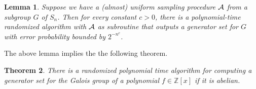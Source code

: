 \documentclass{article}
\newtheorem{theorem}{Theorem}[section]
\newtheorem{lemma}[theorem]{Lemma}
\newcommand{\Z}[0]{\ensuremath{\mathbb{Z}}}
\renewcommand{\angle}[1]{\langle #1\rangle}
\newcommand{\Prob}{\ensuremath{\mathrm{Prob}}}
\begin{document}
\begin{lemma}
  Suppose we have a (almost) uniform sampling procedure ${\cal A}$
  from a subgroup $G$ of $S_n$. Then for every constant $c>0$, there
  is a polynomial-time randomized algorithm with ${\cal A}$ as
  subroutine that outputs a generator set for $G$ with error
  probability bounded by $2^{-n^c}$.
\end{lemma}
%
%  

The above lemma implies the the following theorem.

\begin{theorem}
  There is a randomized polynomial time algorithm for computing a
  generator set for the Galois group of a polynomial $f\in\Z[x]$ if it
  is abelian.
\end{theorem}

%
%
\end{document}
